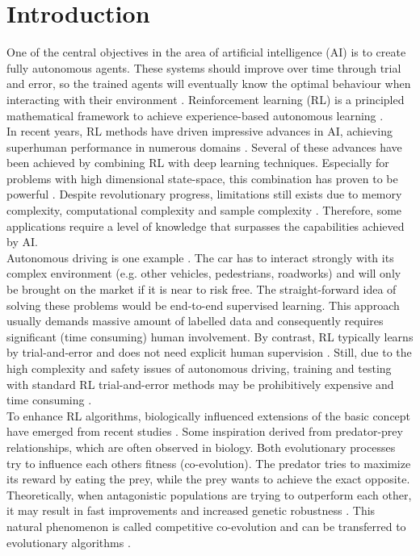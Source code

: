 \section{Introduction}
\label{Introduction}

One of the central objectives in the area of artificial intelligence (AI) is to create fully autonomous agents. These systems should improve over time through trial and error, so the trained agents will eventually know the optimal behaviour when interacting with their environment \cite{brundage17}. Reinforcement learning (RL) is a principled mathematical framework to achieve experience-based autonomous learning \cite{strehl09}.\\
In recent years, RL methods have driven impressive advances in AI, achieving superhuman performance in numerous domains \cite{chessSilver2017mastering, GoalphaGosilver2017mastering}. Several of these advances have been achieved by combining RL with deep learning techniques. Especially for problems with high dimensional state-space, this combination has proven to be powerful \cite{lavet18}.
Despite revolutionary progress, limitations still exists due to memory complexity, computational complexity and sample complexity \cite{strehl09}. Therefore, some applications require a level of knowledge that surpasses the capabilities achieved by AI.\\
Autonomous driving is one example \cite{sallab17}. The car has to interact strongly with its complex environment (e.g. other vehicles, pedestrians, roadworks) and will only be brought on the market if it is near to risk free. The straight-forward idea of solving these problems would be end-to-end supervised learning. This approach usually demands massive amount of labelled data and consequently requires significant (time consuming) human involvement. By contrast, RL typically learns by trial-and-error and does not need explicit human supervision \cite{you17}. Still, due to the high complexity and safety issues of autonomous driving, training and testing with standard RL trial-and-error methods may be prohibitively expensive and time consuming \cite{uesato18}.\\
To enhance RL algorithms, biologically influenced extensions of the basic concept have emerged from recent studies \cite{environmentBansal2017Oct, gabor19, robustPinto2017Mar, uesato18}. Some inspiration derived from predator-prey relationships, which are often observed in biology. Both evolutionary processes try to influence each others fitness (co-evolution). The predator tries to maximize its reward by eating the prey, while the prey wants to achieve the exact opposite. Theoretically, when antagonistic populations are trying to outperform each other, it may result in fast improvements and increased genetic robustness \cite{berenos10}. This natural phenomenon is called competitive co-evolution and can be transferred to evolutionary algorithms \cite{gabor19}.\\
